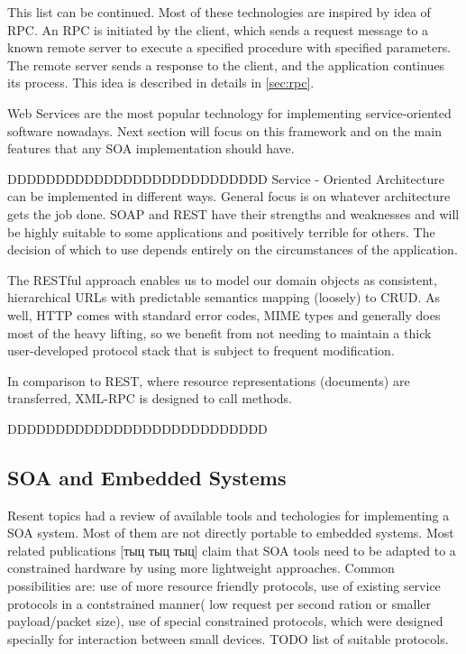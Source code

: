 This list can be continued. Most of these technologies are inspired by idea
of \gls{RPC}. An \gls{RPC} is initiated by the client, which sends a request
message to a known remote server to execute a specified procedure with specified
parameters. The remote server sends a response to the client, and the application continues its process.
This idea is described in details in \autoref{sec:rpc}.



Web Services are the most popular technology for implementing
service-oriented software nowadays. Next section will focus on this framework
and on the main features that any \gls{SOA} implementation should have.







DDDDDDDDDDDDDDDDDDDDDDDDDDD
Service
-
Oriented Architecture can be implemented in different ways. General focus is on
whatever architecture gets the job done. SOAP and REST have their strengths and weaknesses
and will be highly suitable to some
applications and positively terrible for others. The decision of
which to use depends entirely on the circumstances of the application.

The RESTful approach enables us to model our domain objects as consistent,
hierarchical URLs with predictable semantics mapping (loosely) to CRUD.  As well, HTTP comes with standard error codes, MIME types and generally does most of the heavy lifting, so we benefit from not needing to maintain a thick user-developed protocol stack that is subject to frequent modification.

In comparison to REST, where resource representations (documents) are
transferred, XML-RPC is designed to call methods.

DDDDDDDDDDDDDDDDDDDDDDDDDDD

\subsection{SOA and Embedded Systems}

Resent topics had a review of available tools and techologies for implementing a
\gls{SOA} system. Most of them are not directly portable to embedded systems.
Most related publications [тыц тыц тыц] claim that SOA tools need to be adapted
to a constrained hardware by using more lightweight approaches.
Common possibilities are: use of more resource friendly protocols, use of
existing service protocols in a contstrained manner( low request per second
ration or smaller payload/packet size), use of special constrained protocols,
which were designed specially for interaction between small devices.
TODO list of suitable  protocols.


